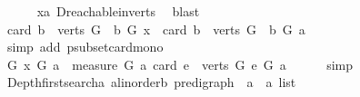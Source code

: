 \begin{isabellebody}
\ \ \ \ \isamarkupfalse%
\ xa\ D{\isachardot}{\kern0pt}reachable{}{\isacharunderscore}{\kern0pt}in{\isacharunderscore}{\kern0pt}verts{\isacharparenleft}{\kern0pt}{}{\isacharparenright}{\kern0pt}\ \isamarkupfalse%
\ blast\ \isanewline
\ \ \isamarkupfalse%
\ \isamarkupfalse%
\ {\isachardoublequoteopen}card\ {\isacharbraceleft}{\kern0pt}b\ {\isasymin}\ verts\ G{\isachardot}{\kern0pt}\ \ b\ {\isasymrightarrow}\isactrlsup {\isacharplus}{\kern0pt}\isactrlbsub G\isactrlesub \ x{\isacharbraceright}{\kern0pt}\ {\isacharless}{\kern0pt}\ card\ {\isacharbraceleft}{\kern0pt}b\ {\isasymin}\ verts\ G{\isachardot}{\kern0pt}\ \ b\ {\isasymrightarrow}\isactrlsup {\isacharplus}{\kern0pt}\isactrlbsub G\isactrlesub \ a{\isacharbraceright}{\kern0pt}{\isachardoublequoteclose}\isanewline
\ \ \ \ \isamarkupfalse%
\ {\isacharparenleft}{\kern0pt}simp\ add{\isacharcolon}{\kern0pt}\ psubset{\isacharunderscore}{\kern0pt}card{\isacharunderscore}{\kern0pt}mono{\isacharparenright}{\kern0pt}\isanewline
\ \ \isamarkupfalse%
\ \isamarkupfalse%
\ {\isachardoublequoteopen}{\isacharparenleft}{\kern0pt}{\isacharparenleft}{\kern0pt}G{\isacharcomma}{\kern0pt}\ x{\isacharparenright}{\kern0pt}{\isacharcomma}{\kern0pt}\ G{\isacharcomma}{\kern0pt}\ a{\isacharparenright}{\kern0pt}\ {\isasymin}\ measure\ {\isacharparenleft}{\kern0pt}{\isasymlambda}{\isacharparenleft}{\kern0pt}G{\isacharcomma}{\kern0pt}\ a{\isacharparenright}{\kern0pt}{\isachardot}{\kern0pt}\ card\ {\isacharbraceleft}{\kern0pt}e\ {\isasymin}\ verts\ G{\isachardot}{\kern0pt}\ e\ {\isasymrightarrow}\isactrlsup {\isacharplus}{\kern0pt}\isactrlbsub G\isactrlesub \ a{\isacharbraceright}{\kern0pt}{\isacharparenright}{\kern0pt}{\isachardoublequoteclose}\isanewline
\ \ \ \ \isamarkupfalse%
\ simp\isanewline
{}\isamarkupfalse%
%
\endisatagproof
{\isafoldproof}%
%
\isadelimproof
\isanewline
%
\endisadelimproof
\isanewline
\isanewline
{}\isamarkupfalse%
\ Depth{\isacharunderscore}{\kern0pt}first{\isacharunderscore}{\kern0pt}search{\isacharunderscore}{\kern0pt}a{\isacharcolon}{\kern0pt}{\isacharcolon}{\kern0pt}\ {\isachardoublequoteopen}{\isacharparenleft}{\kern0pt}{\isacharprime}{\kern0pt}a{\isacharcolon}{\kern0pt}{\isacharcolon}{\kern0pt}linorder{\isacharcomma}{\kern0pt}{\isacharprime}{\kern0pt}b{\isacharparenright}{\kern0pt}\ pre{\isacharunderscore}{\kern0pt}digraph\ {\isasymRightarrow}\ {\isacharprime}{\kern0pt}a\ {\isasymRightarrow}\ {\isacharprime}{\kern0pt}a\ list{\isachardoublequoteclose}\isanewline

\end{isabellebody}
